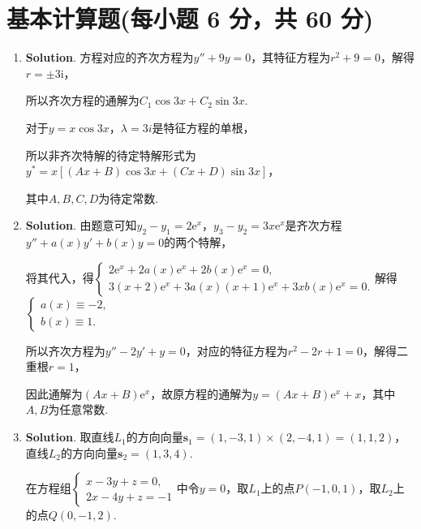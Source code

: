 \documentclass[../Main.tex]{subfiles}
\begin{document}
\section{基本计算题(每小题 6 分，共 60 分)}
\begin{enumerate}
    \item \textbf{Solution}. 方程对应的齐次方程为$y''+9y=0$，其特征方程为$r^{2}+9
              =0$，解得$r=\pm 3\mathrm{i}$，

          所以齐次方程的通解为$C_{1}\cos 3x + C_{2}\sin 3x$.

          对于$y=x\cos 3x$，$\lambda = 3i$是特征方程的单根，

          所以非齐次特解的待定特解形式为$y^{*}=x\left[(Ax+B)\cos 3x + (Cx+D)\sin 3x\right
              ]$，

          其中$A,B,C,D$为待定常数.

    \item \textbf{Solution}. 由题意可知$y_{2}-y_{1}=2\mathrm{e}^{x}$，$y_{3}-y_{2}
              =3x\mathrm{e}^{x}$是齐次方程$y''+a(x)y'+b(x)y=0$的两个特解，

          将其代入，得$\begin{cases}
                  2\mathrm{e}^{x}+2a(x)\mathrm{e}^{x}+2b(x)\mathrm{e}^{x}=0, \\
                  3(x+2)\mathrm{e}^{x}+3a(x)(x+1)\mathrm{e}^{x}+3xb(x)\mathrm{e}^{x}=0.
              \end{cases}$解得$\begin{cases}
                  a(x)\equiv -2, \\
                  b(x)\equiv 1.
              \end{cases}$

          所以齐次方程为$y''-2y'+y=0$，对应的特征方程为$r^{2}-2r+1=0$，解得二重根$r=1$，

          因此通解为$(Ax+B)\mathrm{e}^{x}$，故原方程的通解为$y = (Ax+B)\mathrm{e}^{x}
              + x$，其中$A,B$为任意常数.

    \item \textbf{Solution}. 取直线$L_{1}$的方向向量$\boldsymbol{s}_{1}=(1,-3,1)\times
              (2,-4,1)=(1,1,2)$，直线$L_{2}$的方向向量$\boldsymbol{s}_{2}=(1,3,4)$.

          在方程组$\begin{cases}
                  x-3y+z=0, \\
                  2x-4y+z=-1
              \end{cases}$中令$y=0$，取$L_{1}$上的点$P(-1,0,1)$，取$L_{2}$上的点$Q(0,-1,2
              )$.


\end{enumerate}
\end{document}
